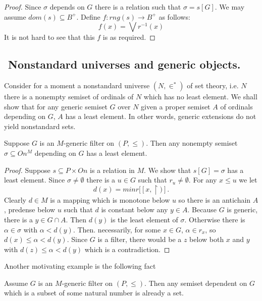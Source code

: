 \begin{proof}
Since $\sigma$ depends on $G$ there is a relation such that $\sigma=s[G]$. We may assume $dom(s)\subseteq B^+$. Define $f:rng(s)\to B^+$
as follows:
$$ %
f(x)=\bigvee r^{-1}(x)
$$ %
It is not hard to see that this $f$ is as required.
\end{proof}


\subsection{${}$ \hspace{-1em}Nonstandard universes and generic objects.}

Consider for a moment a nonstandard universe $(N,\in^*)$ of set theory, %
i.e. $N$ there is a nonempty semiset of ordinals of $N$ which has no least element. We shall show that for any generic semiset $G$ over $N$ given a proper semiset $A$ of ordinals depending on $G$, $A$ has a least element.
In other words, generic extensions do not yield nonstandard sets.

\begin{lemma}
Suppose $G$ is an $M$-generic filter on $(P,\leq)$. Then any nonempty semiset $\sigma\subseteq On^M$ depending on $G$ has a least element.
\end{lemma}

\begin{proof}
Suppose $s\subseteq P\times On$ is a relation in $M$. We show that $s[G]=\sigma$ has a least element. Since $\sigma\neq\emptyset$ there is a $u\in G$
such that $r_u\neq\emptyset$. For any $x\leq u$ we let
$$ %
   d(x)=min r[ [x,\upharpoonright) ].
$$ %
Clearly $d\in M$ is a mapping which is monotone below $u$ so %
there is an antichain $A$, predense below $u$
such that $d$ is constant below any $y\in A$. Because $G$ is generic, there is a $y\in G\cap A$. Then $d(y)$ is the least element of $\sigma$. Otherwise there
is $\alpha\in\sigma$ with $\alpha<d(y)$. Then. necessarily, for some $x\in G$, $\alpha\in r_x$, so $d(x)\leq\alpha<d(y)$. Since $G$ is a filter, there would be
a $z$ below both $x$ and $y$ with $d(z)\leq\alpha<d(y)$ which is a contradiction.
\end{proof}

Another motivating example is the following fact

\begin{fact}
Assume $G$ is an $M$-generic filter on $(P,\leq)$. Then any semiset dependent on $G$ which is a subset of some natural number is already a set.
\end{fact}

